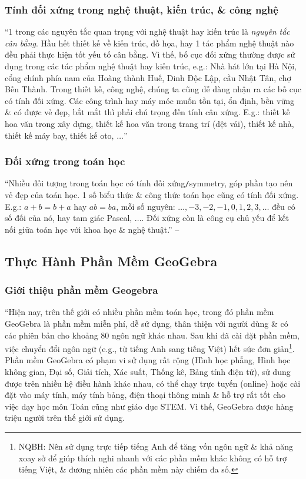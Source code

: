 \documentclass{article}
\numberwithin{equation}{section}
\begin{document}
\subsubsection{Tính đối xứng trong nghệ thuật, kiến trúc, \& công nghệ}
``1 trong các nguyên tắc quan trọng với nghệ thuật hay kiến trúc là \textit{nguyên tắc cân bằng}. Hầu hết thiết kế về kiến trúc, đồ họa, hay 1 tác phẩm nghệ thuật nào đều phải thực hiện tốt yếu tố cân bằng. Vì thế, bố cục đối xứng thường được sử dụng trong các tác phẩm nghệ thuật hay kiến trúc, e.g.: Nhà hát lớn tại Hà Nội, cổng chính phía nam của Hoàng thành Huế, Dinh Độc Lập, cầu Nhật Tân, chợ Bến Thành. Trong thiết kế, công nghệ, chúng ta cũng dễ dàng nhận ra các bố cục có tính đối xứng. Các công trình hay máy móc muốn tồn tại, ổn định, bền vững \& có được vẻ đẹp, bắt mắt thì phải chú trọng đến tính cân xứng. E.g.: thiết kế hoa văn trong xây dựng, thiết kế hoa văn trong trang trí (dệt vải), thiết kế nhà, thiết kế máy bay, thiết kế oto, $\ldots$'' \cite[pp. 114--115]{Thai_Anh_Dat_Ha_Loan_Nam_Quang_Toan_6_tap_1}

\subsubsection{Đối xứng trong toán học}
``Nhiều đối tượng trong toán học có tính đối xứng\texttt{/}symmetry, góp phần tạo nên vẻ đẹp của toán học. 1 số biểu thức \& công thức toán học cũng có tính đối xứng. E.g.: $a + b = b + a$ hay $ab = ba$, mỗi số nguyên: $\ldots,-3,-2,-1,0,1,2,3,\ldots$ đều có số đối của nó, hay tam giác Pascal, $\ldots$. Đối xứng còn là công cụ chủ yếu để kết nối giữa toán học với khoa học \& nghệ thuật.'' -- \cite[p. 115]{Thai_Anh_Dat_Ha_Loan_Nam_Quang_Toan_6_tap_1}

\subsection{Thực Hành Phần Mềm GeoGebra}

\subsubsection{Giới thiệu phần mềm Geogebra}
``Hiện nay, trên thế giới có nhiều phần mềm toán học, trong đó phần mềm GeoGebra là phần mềm miễn phí, dễ sử dụng, thân thiện với người dùng \& có các phiên bản cho khoảng 80 ngôn ngữ khác nhau. Sau khi đã cài đặt phần mềm, việc chuyển đổi ngôn ngữ (e.g., từ tiếng Anh sang tiếng Việt) hết sức đơn giản\footnote{NQBH: Nên sử dụng trực tiếp tiếng Anh để tăng vốn ngôn ngữ \& khả năng xoay sở để giúp thích nghi nhanh với các phần mềm khác không có hỗ trợ tiếng Việt, \& đương nhiên các phần mềm này chiếm đa số.}. Phần mềm GeoGebra có phạm vi sử dụng rất rộng (Hình học phẳng, Hình học không gian, Đại số, Giải tích, Xác suất, Thống kê, Bảng tính điện tử), sử dung được trên nhiều hệ điều hành khác nhau, có thể chạy trực tuyến (online) hoặc cài đặt vào máy tính, máy tính bảng, điện thoại thông minh \& hỗ trợ rất tốt cho việc dạy học môn Toán cũng như giáo dục STEM. Vì thế, GeoGebra được hàng triệu người trên thế giới sử dụng.
\end{document}
